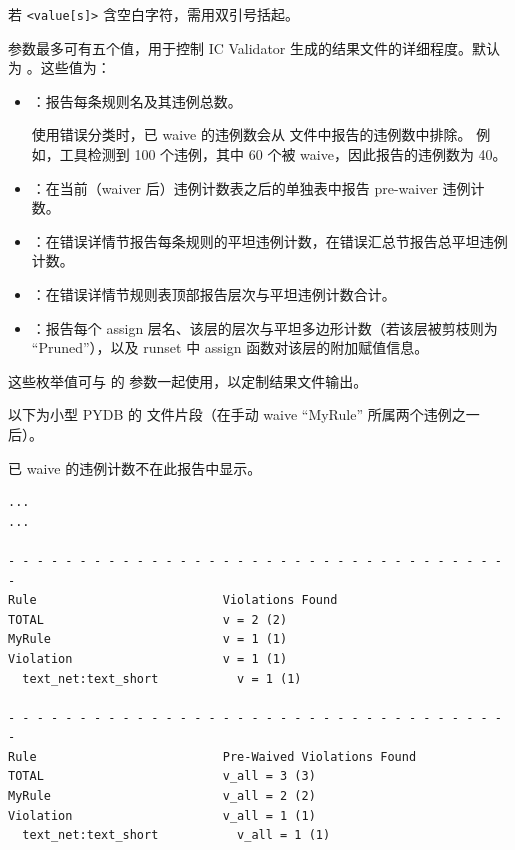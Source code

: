 \begin{noteBox}
若 \texttt{<value[s]>} 含空白字符，需用双引号括起。
\end{noteBox}

 参数最多可有五个值，用于控制 IC Validator 生成的结果文件的详细程度。默认为 。这些值为：
\begin{itemize}
  \item {}：报告每条规则名及其违例总数。
\begin{noteBox}
使用错误分类时，已 waive 的违例数会从  文件中报告的违例数中排除。
例如，工具检测到 100 个违例，其中 60 个被 waive，因此报告的违例数为 40。
\end{noteBox}
  \item {}：在当前（waiver 后）违例计数表之后的单独表中报告 pre-waiver 违例计数。
  \item {}：在错误详情节报告每条规则的平坦违例计数，在错误汇总节报告总平坦违例计数。
  \item {}：在错误详情节规则表顶部报告层次与平坦违例计数合计。
  \item {}：报告每个 assign 层名、该层的层次与平坦多边形计数（若该层被剪枝则为 ``Pruned''），以及 runset 中 assign 函数对该层的附加赋值信息。
\end{itemize}

这些枚举值可与  的  参数一起使用，以定制结果文件输出。

以下为小型 PYDB 的  文件片段（在手动 waive ``MyRule'' 所属两个违例之一后）。
\begin{noteBox}
已 waive 的违例计数不在此报告中显示。
\end{noteBox}
\begin{lstlisting}[style=shell]
...
...

- - - - - - - - - - - - - - - - - - - - - - - - - - - - - - - - - - - -
Rule                          Violations Found
TOTAL                         v = 2 (2)
MyRule                        v = 1 (1)
Violation                     v = 1 (1)
  text_net:text_short           v = 1 (1)

- - - - - - - - - - - - - - - - - - - - - - - - - - - - - - - - - - - -
Rule                          Pre-Waived Violations Found
TOTAL                         v_all = 3 (3)
MyRule                        v_all = 2 (2)
Violation                     v_all = 1 (1)
  text_net:text_short           v_all = 1 (1)
\end{lstlisting}

